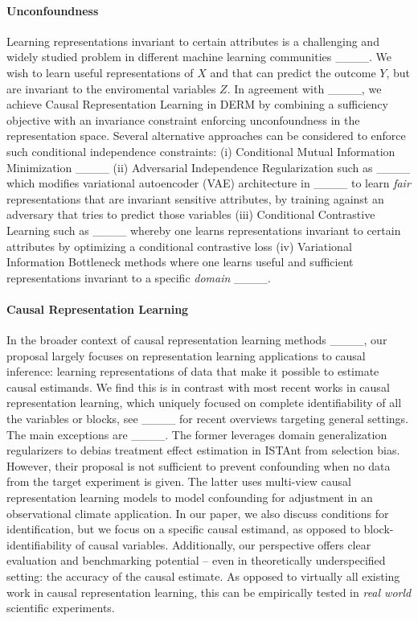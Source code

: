 \paragraph{Unconfoundness} Learning representations invariant to certain attributes is a challenging and widely studied problem in different machine learning communities ____. We wish to learn useful representations of $X$ and that can predict the outcome $Y$, but are invariant to the enviromental variables $Z$. In agreement with ____, we achieve Causal Representation Learning in DERM by combining a sufficiency objective with an invariance constraint enforcing unconfoundness in the representation space. Several alternative approaches can be considered to enforce such conditional independence constraints:  (i) Conditional Mutual Information Minimization ____ (ii) Adversarial Independence Regularization such as ____ which modifies variational autoencoder (VAE) architecture in ____ to learn \textit{fair} representations that are invariant sensitive attributes, by training against an adversary that tries to predict those variables (iii) Conditional Contrastive Learning such as ____ whereby one learns representations invariant to certain attributes by optimizing a conditional contrastive loss (iv) Variational Information Bottleneck methods where one learns useful and sufficient representations invariant to a specific \textit{domain} ____.

\paragraph{Causal Representation Learning} In the broader context of causal representation learning methods ____, our proposal largely focuses on representation learning applications to causal inference: learning representations of data that make it possible to estimate causal estimands. We find this is in contrast with most recent works in causal representation learning, which uniquely focused on complete identifiability of all the variables or blocks, see ____ for recent overviews targeting general settings. The main exceptions are ____. The former leverages domain generalization regularizers to debias treatment effect estimation in ISTAnt from selection bias. However, their proposal is not sufficient to prevent confounding when no data from the target experiment is given. The latter uses multi-view causal representation learning models to model confounding for adjustment in an observational climate application. In our paper, we also discuss conditions for identification, but we focus on a specific causal estimand, as opposed to block-identifiability of causal variables. Additionally, our perspective offers clear evaluation and benchmarking potential -- even in theoretically underspecified setting: the accuracy of the causal estimate. As opposed to virtually all existing work in causal representation learning, this can be empirically tested in \textit{real world} scientific experiments.